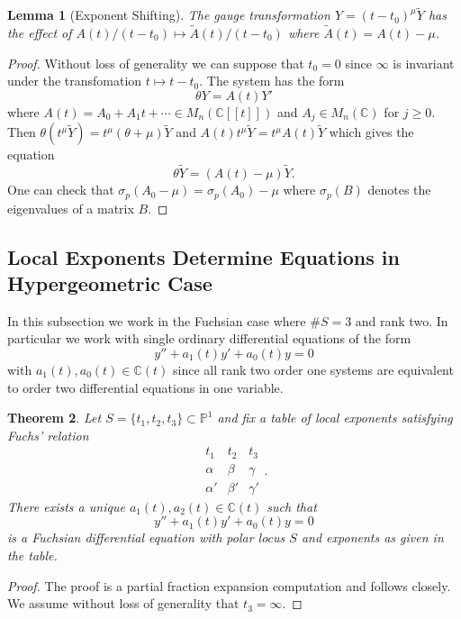 \documentclass[]{book}
\numberwithin{equation}{section}
\newtheorem{theorem}{Theorem}[subsection]
\newtheorem{lemma}[theorem]{Lemma}
\theoremstyle{definition}
\theoremstyle{remark}
\newcommand{\CC}{\mathbb{C}}
\newcommand{\PP}{\mathbb{P}}
\begin{document}
\begin{lemma}[Exponent Shifting]\label{L:exponent-shifting}
	The gauge transformation $Y=(t-t_0)^{\mu}\widetilde{Y}$ has the effect of $A(t)/(t-t_0)\mapsto \widetilde{A}(t)/(t-t_0)$ where $\widetilde{A}(t) = A(t)-\mu$.
\end{lemma}
\begin{proof}
	Without loss of generality we can suppose that $t_0=0$ since $\infty$ is invariant under the transfomation $t\mapsto t-t_0$. 
	The system has the form 
	 $$ \theta Y = A(t) Y' $$
	where $A(t) = A_0 + A_1 t + \cdots \in M_n(\CC[[t]])$ and $A_j \in M_n(\CC)$ for $j\geq 0$. 
	Then $\theta(t^{\mu}\widetilde{Y}) = t^{\mu}(\theta+\mu)\widetilde{Y}$ and $A(t)t^{\mu}\widetilde{Y} = t^{\mu}A(t)\widetilde{Y}$ which gives the equation
	 $$ \theta \widetilde{Y} = (A(t)-\mu) \widetilde{Y}.$$
	One can check that $\sigma_p(A_0-\mu) = \sigma_p(A_0)-\mu$ where $\sigma_p(B)$ denotes the eigenvalues of a matrix $B$.
\end{proof}

\subsection[Exponents Determine Equations]{Local Exponents Determine Equations in Hypergeometric Case}
In this subsection we work in the Fuchsian case where $\#S=3$ and rank two. 
In particular we work with single ordinary differential equations of the form
 $$ y'' + a_1(t)y' + a_0(t) y =0 $$
with $a_1(t),a_0(t) \in \CC(t)$ since all rank two order one systems are equivalent to order two differential equations in one variable.

\begin{theorem}\label{T:exponents-determine-equation}
Let $S = \lbrace t_1,t_2,t_3 \rbrace \subset \PP^1$ and fix a table of local exponents satisfying Fuchs' relation  
$$\begin{array}{ccc}
t_1& t_2 & t_3 \\
\hline \hline \alpha & \beta & \gamma \\
\alpha' & \beta' & \gamma' 
\end{array}.$$
There exists a unique $a_1(t),a_2(t) \in \CC(t)$ such that 
\begin{equation}\label{E:fixed-exponents}
  y''+a_1(t) y' + a_0(t) y =0
 \end{equation}
is a Fuchsian differential equation with polar locus $S$ and exponents as given in the table. 
\end{theorem}
\begin{proof}
	The proof is a partial fraction expansion computation and follows \cite[Chapter 2, Proposition 1.1.1]{Iwasaki1991} closely.
	We assume without loss of generality that $t_3=\infty$. 
\end{proof}
\end{document}
